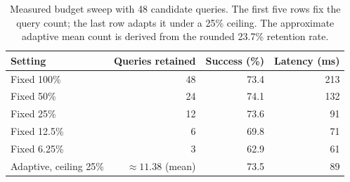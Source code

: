 \begin{table}[t]
\centering
\caption{Measured budget sweep with 48 candidate queries. The first five rows fix the query count; the last row adapts it under a 25\% ceiling. The approximate adaptive mean count is derived from the rounded 23.7\% retention rate.}
\label{tab:budget}
\small
\begin{tabular}{lrrr}
\toprule
Setting & Queries retained & Success (\%) & Latency (ms)\\
\midrule
Fixed 100\% & 48 & 73.4 & 213\\
Fixed 50\% & 24 & 74.1 & 132\\
Fixed 25\% & 12 & 73.6 & 91\\
Fixed 12.5\% & 6 & 69.8 & 71\\
Fixed 6.25\% & 3 & 62.9 & 61\\
\midrule
Adaptive, ceiling 25\% & $\approx 11.38$ (mean) & 73.5 & 89\\
\bottomrule
\end{tabular}
\end{table}
